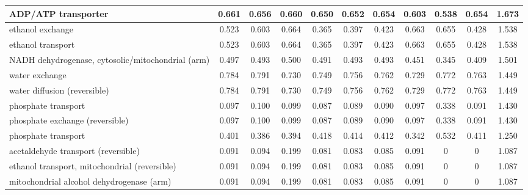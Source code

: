 \begin{longtable}{|l|c|c|c|c|c|c|c|c|c|c|}
ADP/ATP transporter                                        & 0.661     & 0.656     & 0.660    & 0.650             & 0.652 & 0.654  & 0.603         & 0.538  & 0.654    & 1.673 \\ \hline
ethanol exchange                                           & 0.523     & 0.603     & 0.664    & 0.365             & 0.397 & 0.423  & 0.663         & 0.655  & 0.428    & 1.538 \\ \hline
ethanol transport                                          & 0.523     & 0.603     & 0.664    & 0.365             & 0.397 & 0.423  & 0.663         & 0.655  & 0.428    & 1.538 \\ \hline
NADH dehydrogenase, cytosolic/mitochondrial (arm)          & 0.497     & 0.493     & 0.500    & 0.491             & 0.493 & 0.493  & 0.451         & 0.345  & 0.409    & 1.501 \\ \hline
water exchange                                             & 0.784     & 0.791     & 0.730    & 0.749             & 0.756 & 0.762  & 0.729         & 0.772  & 0.763    & 1.449 \\ \hline
water diffusion (reversible)                               & 0.784     & 0.791     & 0.730    & 0.749             & 0.756 & 0.762  & 0.729         & 0.772  & 0.763    & 1.449 \\ \hline
phosphate transport                                        & 0.097     & 0.100     & 0.099    & 0.087             & 0.089 & 0.090  & 0.097         & 0.338  & 0.091    & 1.430 \\ \hline
phosphate exchange (reversible)                            & 0.097     & 0.100     & 0.099    & 0.087             & 0.089 & 0.090  & 0.097         & 0.338  & 0.091    & 1.430 \\ \hline
phosphate transport                                        & 0.401     & 0.386     & 0.394    & 0.418             & 0.414 & 0.412  & 0.342         & 0.532  & 0.411    & 1.250 \\ \hline
acetaldehyde transport (reversible)                        & 0.091     & 0.094     & 0.199    & 0.081             & 0.083 & 0.085  & 0.091         & 0      & 0        & 1.087 \\ \hline
ethanol transport, mitochondrial (reversible)              & 0.091     & 0.094     & 0.199    & 0.081             & 0.083 & 0.085  & 0.091         & 0      & 0        & 1.087 \\ \hline
mitochondrial alcohol dehydrogenase (arm)                  & 0.091     & 0.094     & 0.199    & 0.081             & 0.083 & 0.085  & 0.091         & 0      & 0        & 1.087 \\ \hline

\end{longtable}
